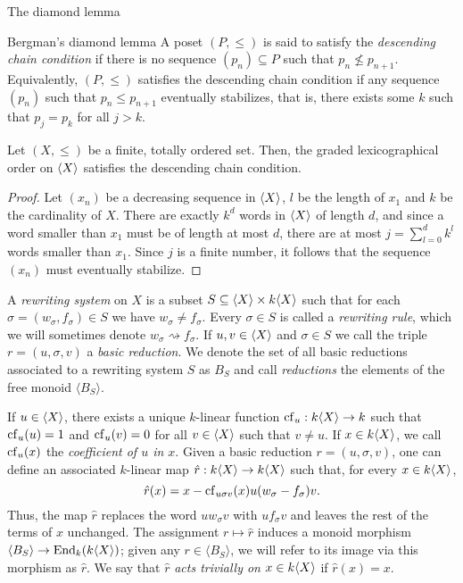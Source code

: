 \begin{chapter}{The diamond lemma}
\begin{section}{Bergman's diamond lemma}
A poset $(P,\leq)$ is said to satisfy the \emph{descending chain condition} if there is no sequence $(p_n)\subseteq P$ such that $p_n\not \leq p_{n+1}$. Equivalently, $(P,\leq)$ satisfies the descending chain condition if any sequence $(p_n)$ such that $p_n \leq p_{n+1}$ eventually stabilizes, that is, there exists some $k$ such that $p_j = p_k$ for all $j>k$.

\begin{lemma}\label{noeth} Let $(X,\leq)$ be a finite, totally ordered set. Then, the graded lexicographical order on $\langle X\rangle$ satisfies the descending chain condition.
\end{lemma}
\begin{proof} Let $(x_n)$ be a decreasing sequence in $\langle X\rangle$, $l$ be the length of $x_1$ and $k$ be the cardinality of $X$. There are exactly $k^d$ words in $\langle X\rangle$ of length $d$, and since a word smaller than $x_1$ must be of length at most $d$, there are at most $j=\sum_{l=0}^d k^l$ words smaller than $x_1$. Since $j$ is a finite number, it follows that the sequence $(x_n)$ must eventually stabilize.
\end{proof}

A \emph{rewriting system} on $X$ is a subset $S\subseteq \langle X\rangle \times k\langle X\rangle$ such that for each $\sigma=(w_\sigma, f_\sigma)\in S$ we have $w_\sigma \neq f_\sigma$. Every $\sigma \in S$ is called a \emph{rewriting rule}, which we will sometimes denote $w_\sigma \rightsquigarrow f_\sigma$. If $u,v\in\langle X\rangle$ and $\sigma\in S$ we call the triple $r=(u,\sigma,v)$ a \emph{basic reduction}. We denote the set of all basic reductions associated to a rewriting system $S$ as $B_S$ and call \emph{reductions} the elements of the free monoid $\langle B_S\rangle$.

If $u\in\langle X\rangle$, there exists a unique $k$-linear function $\mathrm{cf}_u:k\langle X\rangle\to k$ such that $\mathrm{cf}_u(u)=1$ and $\mathrm{cf}_u(v)=0$ for all $v\in\langle X\rangle$ such that $v\neq u$. If $x\in k\langle X\rangle$, we call $\mathrm{cf}_u(x)$ the \emph{coefficient of $u$ in $x$}. Given a basic reduction $r=(u,\sigma,v)$, one can define an associated $k$-linear map $\hat{r}:k\langle X\rangle\to k\langle X\rangle$ such that, for every $x\in k\langle X\rangle$,
\[\hat{r}(x)=x-\mathrm{cf}_{u\sigma v}(x) u(w_\sigma - f_\sigma)v.\]
Thus, the map $\hat{r}$ replaces the word $uw_\sigma v$ with $uf_\sigma v$ and leaves the rest of the terms of $x$ unchanged. The assignment $r\mapsto \hat{r}$ induces a monoid morphism $\langle B_S\rangle \to \mathrm{End}_k(k\langle X\rangle)$; given any $r\in\langle B_S\rangle$, we will refer to its image via this morphism as $\hat{r}$. We say that $\hat{r}$ \emph{acts trivially on $x\in k\langle X\rangle$} if $\hat{r}(x)=x$.


\end{section}
\end{chapter}
